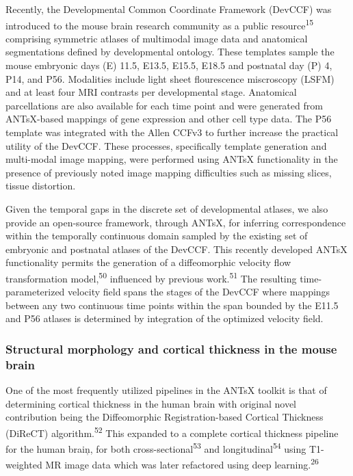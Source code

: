 \documentclass[
  12pt,
]{article}
\begin{document}
Recently, the Developmental Common Coordinate Framework (DevCCF) was
introduced to the mouse brain research community as a public
resource\textsuperscript{15} comprising symmetric atlases of multimodal
image data and anatomical segmentations defined by developmental
ontology. These templates sample the mouse embryonic days (E) 11.5,
E13.5, E15.5, E18.5 and postnatal day (P) 4, P14, and P56. Modalities
include light sheet flourescence miscroscopy (LSFM) and at least four
MRI contrasts per developmental stage. Anatomical parcellations are also
available for each time point and were generated from ANTsX-based
mappings of gene expression and other cell type data. The P56 template
was integrated with the Allen CCFv3 to further increase the practical
utility of the DevCCF. These processes, specifically template generation
and multi-modal image mapping, were performed using ANTsX functionality
in the presence of previously noted image mapping difficulties such as
missing slices, tissue distortion.

Given the temporal gaps in the discrete set of developmental atlases, we
also provide an open-source framework, through ANTsX, for inferring
correspondence within the temporally continuous domain sampled by the
existing set of embryonic and postnatal atlases of the DevCCF. This
recently developed ANTsX functionality permits the generation of a
diffeomorphic velocity flow transformation model,\textsuperscript{50}
influenced by previous work.\textsuperscript{51} The resulting
time-parameterized velocity field spans the stages of the DevCCF where
mappings between any two continuous time points within the span bounded
by the E11.5 and P56 atlases is determined by integration of the
optimized velocity field.

\hypertarget{structural-morphology-and-cortical-thickness-in-the-mouse-brain}{%
\subsubsection{Structural morphology and cortical thickness in the mouse
brain}\label{structural-morphology-and-cortical-thickness-in-the-mouse-brain}}

One of the most frequently utilized pipelines in the ANTsX toolkit is
that of determining cortical thickness in the human brain with original
novel contribution being the Diffeomorphic Registration-based Cortical
Thickness (DiReCT) algorithm.\textsuperscript{52} This expanded to a
complete cortical thickness pipeline for the human braiņ, for both
cross-sectional\textsuperscript{53} and longitudinal\textsuperscript{54}
using T1-weighted MR image data which was later refactored using deep
learning.\textsuperscript{26}
\end{document}
